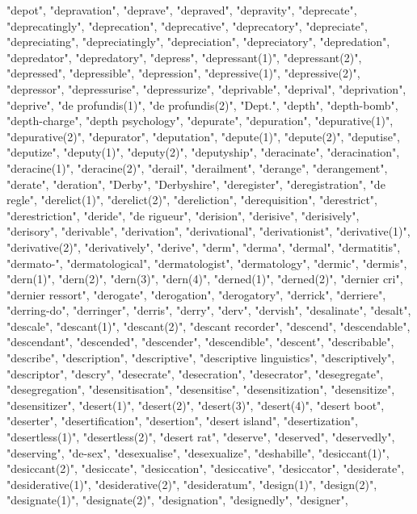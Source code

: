"depot",
"depravation",
"deprave",
"depraved",
"depravity",
"deprecate",
"deprecatingly",
"deprecation",
"deprecative",
"deprecatory",
"depreciate",
"depreciating",
"depreciatingly",
"depreciation",
"depreciatory",
"depredation",
"depredator",
"depredatory",
"depress",
"depressant(1)",
"depressant(2)",
"depressed",
"depressible",
"depression",
"depressive(1)",
"depressive(2)",
"depressor",
"depressurise",
"depressurize",
"deprivable",
"deprival",
"deprivation",
"deprive",
"de profundis(1)",
"de profundis(2)",
"Dept.",
"depth",
"depth-bomb",
"depth-charge",
"depth psychology",
"depurate",
"depuration",
"depurative(1)",
"depurative(2)",
"depurator",
"deputation",
"depute(1)",
"depute(2)",
"deputise",
"deputize",
"deputy(1)",
"deputy(2)",
"deputyship",
"deracinate",
"deracination",
"deracine(1)",
"deracine(2)",
"derail",
"derailment",
"derange",
"derangement",
"derate",
"deration",
"Derby",
"Derbyshire",
"deregister",
"deregistration",
"de regle",
"derelict(1)",
"derelict(2)",
"dereliction",
"derequisition",
"derestrict",
"derestriction",
"deride",
"de rigueur",
"derision",
"derisive",
"derisively",
"derisory",
"derivable",
"derivation",
"derivational",
"derivationist",
"derivative(1)",
"derivative(2)",
"derivatively",
"derive",
"derm",
"derma",
"dermal",
"dermatitis",
"dermato-",
"dermatological",
"dermatologist",
"dermatology",
"dermic",
"dermis",
"dern(1)",
"dern(2)",
"dern(3)",
"dern(4)",
"derned(1)",
"derned(2)",
"dernier cri",
"dernier ressort",
"derogate",
"derogation",
"derogatory",
"derrick",
"derriere",
"derring-do",
"derringer",
"derris",
"derry",
"derv",
"dervish",
"desalinate",
"desalt",
"descale",
"descant(1)",
"descant(2)",
"descant recorder",
"descend",
"descendable",
"descendant",
"descended",
"descender",
"descendible",
"descent",
"describable",
"describe",
"description",
"descriptive",
"descriptive linguistics",
"descriptively",
"descriptor",
"descry",
"desecrate",
"desecration",
"desecrator",
"desegregate",
"desegregation",
"desensitisation",
"desensitise",
"desensitization",
"desensitize",
"desensitizer",
"desert(1)",
"desert(2)",
"desert(3)",
"desert(4)",
"desert boot",
"deserter",
"desertification",
"desertion",
"desert island",
"desertization",
"desertless(1)",
"desertless(2)",
"desert rat",
"deserve",
"deserved",
"deservedly",
"deserving",
"de-sex",
"desexualise",
"desexualize",
"deshabille",
"desiccant(1)",
"desiccant(2)",
"desiccate",
"desiccation",
"desiccative",
"desiccator",
"desiderate",
"desiderative(1)",
"desiderative(2)",
"desideratum",
"design(1)",
"design(2)",
"designate(1)",
"designate(2)",
"designation",
"designedly",
"designer",
